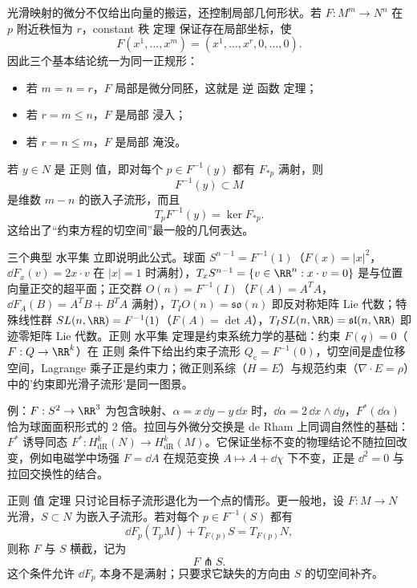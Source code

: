 光滑映射的微分不仅给出向量的搬运，还控制局部几何形状。若 $F:M^m\to N^n$ 在 $p$ 附近秩恒为 $r$，constant 秩 定理 保证存在局部坐标，使
\[
F(x^1,\ldots,x^m)
=(x^1,\ldots,x^r,0,\ldots,0).
\]
因此三个基本结论统一为同一正规形：
\begin{itemize}
\item 若 $m=n=r$，$F$ 局部是微分同胚，这就是 逆 函数 定理；
\item 若 $r=m\le n$，$F$ 是局部 浸入；
\item 若 $r=n\le m$，$F$ 是局部 淹没。
\end{itemize}
若 $y\in N$ 是 正则 值，即对每个 $p\in F^{-1}(y)$ 都有 $F_{*p}$ 满射，则
\begin{equation*}F^{-1}(y)\subset M\end{equation*}
是维数 $m-n$ 的嵌入子流形，而且
\begin{equation}
T_pF^{-1}(y)=\ker F_{*p}.
\label{eq:tangent-regular-level-set}
\end{equation}
这给出了“约束方程的切空间”最一般的几何表达。

三个典型 水平集 立即说明此公式。球面 $S^{n-1}=F^{-1}(1)$（$F(x)=|x|^2$，$\dd F_x(v)=2x\cdot v$ 在 $|x|=1$ 时满射），$T_xS^{n-1}=\{v\in\RR^n:x\cdot v=0\}$ 是与位置向量正交的超平面；正交群 $O(n)=F^{-1}(I)$（$F(A)=A^TA$，$\dd F_A(B)=A^TB+B^TA$ 满射），$T_IO(n)=\mathfrak{so}(n)$ 即反对称矩阵 Lie 代数；特殊线性群 $SL(n,\RR)=F^{-1}(1)$（$F(A)=\det A$），$T_ISL(n,\RR)=\mathfrak{sl}(n,\RR)$ 即迹零矩阵 Lie 代数。正则 水平集 定理是约束系统力学的基础：约束 $F(q)=0$（$F:Q\to\RR^k$）在 正则 条件下给出约束子流形 $Q_{\mathrm c}=F^{-1}(0)$，切空间是虚位移空间，Lagrange 乘子正是约束力；微正则系综（$H=E$）与规范约束（$\nabla\cdot E=\rho$）中的'约束即光滑子流形'是同一图景。

例：$F:S^2\to\RR^3$ 为包含映射、$\alpha=x\,\dd y-y\,\dd x$ 时，$\dd\alpha=2\,\dd x\wedge\dd y$，$F^*(\dd\alpha)$ 恰为球面面积形式的 2 倍。拉回与外微分交换是 de Rham 上同调自然性的基础：$F^*$ 诱导同态 $F^*:H^k_{\mathrm{dR}}(N)\to H^k_{\mathrm{dR}}(M)$。它保证坐标不变的物理结论不随拉回改变，例如电磁学中场强 $F=\dd A$ 在规范变换 $A\mapsto A+\dd\chi$ 下不变，正是 $\dd^2=0$ 与拉回交换性的结合。

正则 值 定理 只讨论目标子流形退化为一个点的情形。更一般地，设 $F:M\to N$ 光滑，$S\subset N$ 为嵌入子流形。若对每个 $p\in F^{-1}(S)$ 都有
\begin{equation}
\boxed{
\dd F_p(T_pM)+T_{F(p)}S=T_{F(p)}N,
}
\label{eq:math-dg-transversality}
\end{equation}
则称 $F$ 与 $S$ 横截，记为
\[
F\pitchfork S.
\]
这个条件允许 $\dd F_p$ 本身不是满射；只要求它缺失的方向由 $S$ 的切空间补齐。


